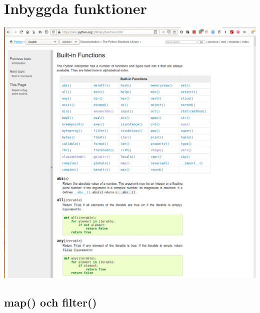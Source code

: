 \mode*

\section{Inbyggda funktioner}

\begin{frame}
  \includegraphics[width=\columnwidth]{figs/docs-built-in.png}
\end{frame}

\subsection{map() och filter()}

\begin{frame}[fragile]
  \begin{example}
    \inputminted[firstline=3,lastline=15]{python}{examples/mapping.py}
  \end{example}
\end{frame}

\begin{frame}[fragile]
  \begin{example}
    \inputminted[firstline=16]{python}{examples/mapping.py}
  \end{example}
\end{frame}

